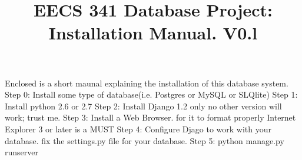 \documentclass[11pt,oneside,a4paper]{article}
\title{EECS 341 Database Project: Installation Manual. V0.l}
\begin{document}
\maketitle
Enclosed is a short maunal explaining the installation of this database system.
Step 0: Install some type of database(i.e. Postgres or MySQL or SLQlite)
Step 1: Install python 2.6 or 2.7 
Step 2: Install Django 1.2 only no other version will work; trust me.  
Step 3: Install a Web Browser. for it to format properly Internet Explorer 3 or later is a MUST
Step 4: Configure Djago to work with your database.  fix the settings.py file for your database.
Step 5: python manage.py runserver
\end{document}
